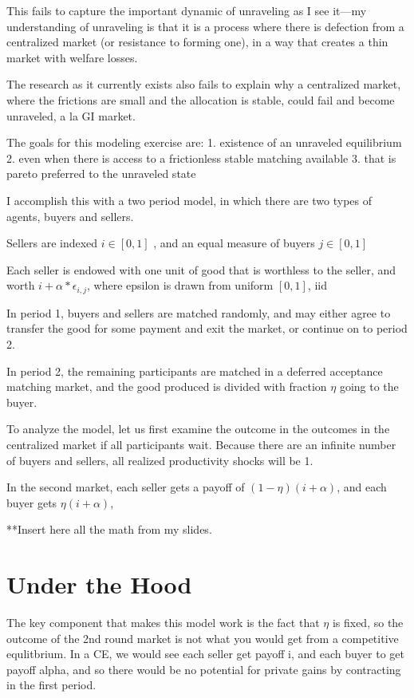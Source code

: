 \documentclass[AER]{AEA}
\begin{document}
This fails to capture the important dynamic of unraveling as I see it—my understanding of unraveling is that it is a process where there is defection from a centralized market (or resistance to forming one), in a way that creates a thin market with welfare losses.  

The research as it currently exists also fails to explain why a centralized market, where the frictions are small and the allocation is stable, could fail and become unraveled, a la GI market.


The goals for this modeling exercise are:
1. existence of an unraveled equilibrium
2. even when there is access to a frictionless stable matching available
3. that is pareto preferred to the unraveled state

I accomplish this with a two period model, in which there are two types of agents, buyers and sellers.

Sellers are indexed $i \in [0,1]$ , and an equal measure of buyers $j \in [0,1]$

Each seller is endowed with one unit of good that is worthless to the seller, and worth $i+\alpha * \epsilon_{i,j}$, where epsilon is drawn from uniform $[0,1]$, iid

In period 1, buyers and sellers are matched randomly, and may either agree to transfer the good for some payment and exit the market, or continue on to period 2.

In period 2, the remaining participants are matched in a deferred acceptance matching market, and the good produced is divided with fraction $\eta$ going to the buyer.

To analyze the model, let us first examine the outcome in the outcomes in the centralized market if all participants wait. 
Because there are an infinite number of buyers and sellers, all realized productivity shocks will be 1. 

In the second market, each seller gets a payoff of $(1-\eta)( i + \alpha)$, and each buyer gets $\eta(i+\alpha)$,

**Insert here all the math from my slides.



\section{Under the Hood}
The key component that makes this model work is the fact that $\eta$ is fixed, so the outcome of the 2nd round market is not what you would get from a competitive equlitbrium.  In a CE, we would see each seller get payoff i, and each buyer to get payoff alpha, and so there would be no potential for private gains by contracting in the first period.  
\end{document}

